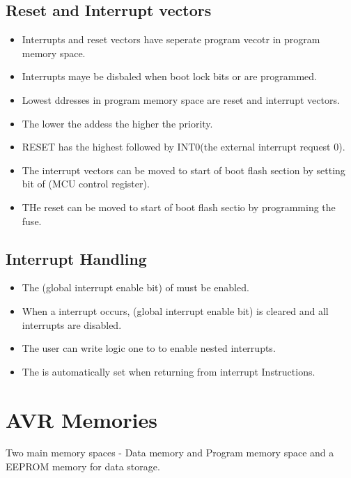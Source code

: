 \documentclass{article}
\begin{document}
\subsection{Reset and Interrupt vectors}
\begin{itemize}
    \item Interrupts and reset vectors have seperate program vecotr in program memory space.
    \item Interrupts maye be disbaled when boot lock bits  or  are programmed.
    \item Lowest ddresses in program memory space are reset and interrupt vectors.
    \item The lower the addess the higher the priority.
    \item RESET has the highest followed by INT0(the external interrupt request 0).
    \item The interrupt vectors can be moved to start of boot flash section by setting  bit of  (MCU control register).
    \item THe reset can be moved to start of boot flash sectio by programming the  fuse.
\end{itemize}

\subsection{Interrupt Handling}
\begin{itemize}
    \item The  (global interrupt enable bit) of  must be enabled.
    \item When a interrupt occurs,  (global interrupt enable bit) is cleared and all interrupts are disabled.
    \item The user can write logic one to  to enable nested interrupts.
    \item The  is automatically set when returning from interrupt Instructions.
\end{itemize}


\section{AVR Memories}
\quad Two main memory spaces - Data memory and Program memory space and a EEPROM memory for data storage.
\end{document}
